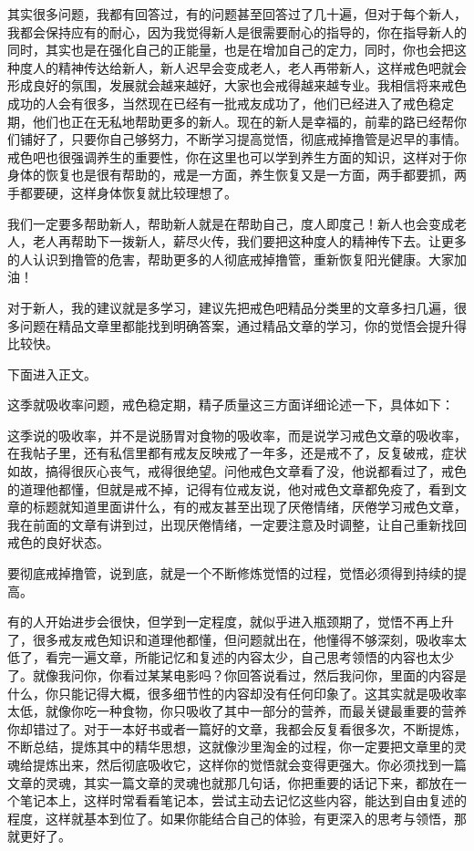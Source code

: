 \documentclass[fontset=founder]{ctexart}
\begin{document}
其实很多问题，我都有回答过，有的问题甚至回答过了几十遍，但对于每个新人，我都会保持应有的耐心，因为我觉得新人是很需要耐心的指导的，你在指导新人的同时，其实也是在强化自己的正能量，也是在增加自己的定力，同时，你也会把这种度人的精神传达给新人，新人迟早会变成老人，老人再带新人，这样戒色吧就会形成良好的氛围，发展就会越来越好，大家也会戒得越来越专业。我相信将来戒色成功的人会有很多，当然现在已经有一批戒友成功了，他们已经进入了戒色稳定期，他们也正在无私地帮助更多的新人。现在的新人是幸福的，前辈的路已经帮你们铺好了，只要你自己够努力，不断学习提高觉悟，彻底戒掉撸管是迟早的事情。戒色吧也很强调养生的重要性，你在这里也可以学到养生方面的知识，这样对于你身体的恢复也是很有帮助的，戒是一方面，养生恢复又是一方面，两手都要抓，两手都要硬，这样身体恢复就比较理想了。

我们一定要多帮助新人，帮助新人就是在帮助自己，度人即度己！新人也会变成老人，老人再帮助下一拨新人，薪尽火传，我们要把这种度人的精神传下去。让更多的人认识到撸管的危害，帮助更多的人彻底戒掉撸管，重新恢复阳光健康。大家加油！

对于新人，我的建议就是多学习，建议先把戒色吧精品分类里的文章多扫几遍，很多问题在精品文章里都能找到明确答案，通过精品文章的学习，你的觉悟会提升得比较快。

下面进入正文。

这季就吸收率问题，戒色稳定期，精子质量这三方面详细论述一下，具体如下：

这季说的吸收率，并不是说肠胃对食物的吸收率，而是说学习戒色文章的吸收率，在我帖子里，还有私信里都有戒友反映戒了一年多，还是戒不了，反复破戒，症状如故，搞得很灰心丧气，戒得很绝望。问他戒色文章看了没，他说都看过了，戒色的道理他都懂，但就是戒不掉，记得有位戒友说，他对戒色文章都免疫了，看到文章的标题就知道里面讲什么，有的戒友甚至出现了厌倦情绪，厌倦学习戒色文章，我在前面的文章有讲到过，出现厌倦情绪，一定要注意及时调整，让自己重新找回戒色的良好状态。

要彻底戒掉撸管，说到底，就是一个不断修炼觉悟的过程，觉悟必须得到持续的提高。

有的人开始进步会很快，但学到一定程度，就似乎进入瓶颈期了，觉悟不再上升了，很多戒友戒色知识和道理他都懂，但问题就出在，他懂得不够深刻，吸收率太低了，看完一遍文章，所能记忆和复述的内容太少，自己思考领悟的内容也太少了。就像我问你，你看过某某电影吗？你回答说看过，然后我问你，里面的内容是什么，你只能记得大概，很多细节性的内容却没有任何印象了。这其实就是吸收率太低，就像你吃一种食物，你只吸收了其中一部分的营养，而最关键最重要的营养你却错过了。对于一本好书或者一篇好的文章，我都会反复看很多次，不断提炼，不断总结，提炼其中的精华思想，这就像沙里淘金的过程，你一定要把文章里的灵魂给提炼出来，然后彻底吸收它，这样你的觉悟就会变得更强大。你必须找到一篇文章的灵魂，其实一篇文章的灵魂也就那几句话，你把重要的话记下来，都放在一个笔记本上，这样时常看看笔记本，尝试主动去记忆这些内容，能达到自由复述的程度，这样就基本到位了。如果你能结合自己的体验，有更深入的思考与领悟，那就更好了。
\end{document}
